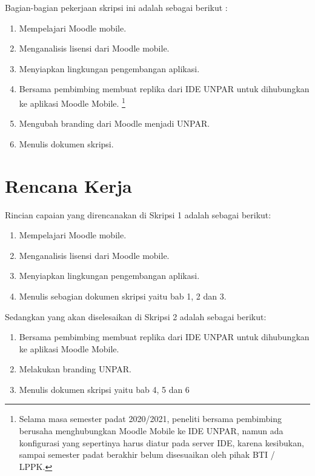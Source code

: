 \documentclass[a4paper,twoside]{article}
\begin{document}
Bagian-bagian pekerjaan skripsi ini adalah sebagai berikut :
	\begin{enumerate}
		\item Mempelajari Moodle mobile.
		\item Menganalisis lisensi dari Moodle mobile.
		\item Menyiapkan lingkungan pengembangan aplikasi.
		\item Bersama pembimbing membuat replika dari IDE UNPAR untuk dihubungkan ke aplikasi Moodle Mobile. \footnote{Selama masa semester padat 2020/2021, peneliti bersama pembimbing berusaha menghubungkan Moodle Mobile ke IDE UNPAR, namun ada konfigurasi yang sepertinya harus diatur pada server IDE, karena kesibukan, sampai semester padat berakhir belum disesuaikan oleh pihak BTI / LPPK.}
		\item Mengubah branding dari Moodle menjadi UNPAR.
		\item Menulis dokumen skripsi.
	\end{enumerate}

\section{Rencana Kerja}
Rincian capaian yang direncanakan di Skripsi 1 adalah sebagai berikut:
\begin{enumerate}
\item Mempelajari Moodle mobile. 
\item Menganalisis lisensi dari Moodle mobile.
\item Menyiapkan lingkungan pengembangan aplikasi.
\item Menulis sebagian dokumen skripsi yaitu bab 1, 2 dan 3.
\end{enumerate}

Sedangkan yang akan diselesaikan di Skripsi 2 adalah sebagai berikut:
\begin{enumerate}
\item Bersama pembimbing membuat replika dari IDE UNPAR untuk dihubungkan ke aplikasi Moodle Mobile.
\item Melakukan branding UNPAR.
\item Menulis dokumen skripsi yaitu bab 4, 5 dan 6
\end{enumerate}
\end{document}
